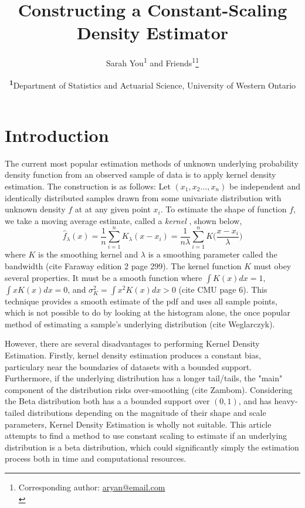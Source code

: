 \documentclass[
	letterpaper, %
	10pt, %
	unnumberedsections, %
	twoside, %
]{LTJournalArticle}
\title{Constructing a Constant-Scaling Density Estimator} %
\author{%
	Sarah You\textsuperscript{1} and Friends\textsuperscript{1}\thanks{Corresponding author: \href{mailto:aryan@email.com}{aryan@email.com}\\}
}
\date{\footnotesize\textsuperscript{\textbf{1}}Department of Statistics and Actuarial Science, University of Western Ontario\\}
\begin{document}
\maketitle %


\section{Introduction}

The current most popular estimation methods of unknown underlying probability density function from an observed sample of data is to apply 
kernel density estimation. The construction is as follows: Let $(x_1,x_2...,x_n)$ be independent and identically distributed samples drawn from some univariate 
distribution with unknown density $f$ at at any given point $x_i$. To estimate the shape of function $f$, we take a moving average estimate, called a \textit{kernel}
, shown below,
\begin{equation}
	\hat{f}_\lambda(x) = \frac{1}{n}\sum_{i=1}^{n}K_\lambda(x-x_i) = \frac{1}{n\lambda}\sum_{i=1}^{n}K\big(\frac{x-x_i}{\lambda}\big)
\end{equation}
where $K$ is the smoothing kernel and $\lambda$ is a smoothing parameter called the bandwidth (cite Faraway edition 2 page 299). The kernel function $K$ must obey 
several properties. It must be a smooth function where $\int K(x)dx = 1$, $\int xK(x)dx = 0$, and $\sigma_K^2 = \int x^2K(x)dx > 0$ (cite CMU page 6). This technique 
provides a smooth estimate of the pdf and uses all sample points, which is not possible to do by looking at the histogram alone, the once popular method of estimating
a sample's underlying distribution (cite Weglarczyk). 

However, there are several disadvantages to performing Kernel Density Estimation. Firstly, kernel density estimation produces a constant bias, particulary near the boundaries
of datasets with a bounded support. Furthermore, if the underlying distribution has a longer tail/tails, the "main" component of the distribution risks over-smoothing 
(cite Zambom). Considering the Beta distribution both has a a bounded support over $(0,1)$, and has heavy-tailed distributions depending on the magnitude of their shape 
and scale parameters, Kernel Density Estimation is wholly not suitable. This article attempts to find a method to use constant scaling to estimate if an underlying 
distribution is a beta distribution, which could significantly simply the estimation process both in time and computational resources.
\end{document}
